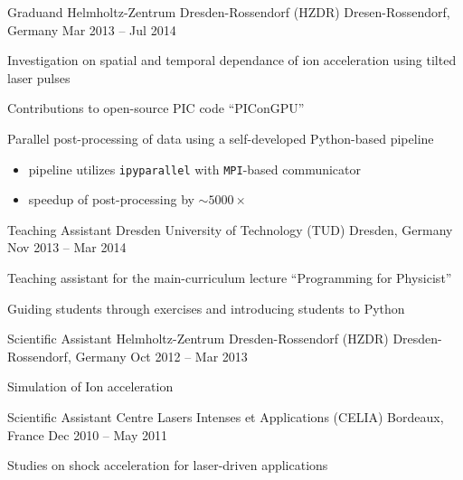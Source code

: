\begin{cventries}
  \cventry
    {Graduand} %
    {Helmholtz-Zentrum Dresden-Rossendorf (HZDR)} %
    {Dresen-Rossendorf, Germany} %
    {Mar 2013 -- Jul 2014} %
    {
      \begin{cvitems} %
        \item Investigation on spatial and temporal dependance of ion acceleration using tilted laser pulses
        \item Contributions to open-source PIC code ``PIConGPU''
        \item Parallel post-processing of data using a self-developed Python-based pipeline
              \begin{itemize}[leftmargin=*, label=$\circ$]
                \item pipeline utilizes \texttt{ipyparallel} with \texttt{MPI}-based communicator
                \item speedup of post-processing by $\sim\!5000\times$
              \end{itemize}
      \end{cvitems}
    }

  \cventry
    {Teaching Assistant} %
    {Dresden University of Technology (TUD)} %
    {Dresden, Germany} %
    {Nov 2013 -- Mar 2014} %
    {
      \begin{cvitems} %
        \item Teaching assistant for the main-curriculum lecture ``Programming for Physicist''
        \item Guiding students through exercises and introducing students to Python
      \end{cvitems}
    }

  \cventry
    {Scientific Assistant} %
    {Helmholtz-Zentrum Dresden-Rossendorf (HZDR)} %
    {Dresden-Rossendorf, Germany} %
    {Oct 2012 -- Mar 2013} %
    {
      \begin{cvitems} %
        \item Simulation of Ion acceleration
      \end{cvitems}
    }

  \cventry
    {Scientific Assistant} %
    {Centre Lasers Intenses et Applications (CELIA)} %
    {Bordeaux, France} %
    {Dec 2010 -- May 2011} %
    {
      \begin{cvitems} %
        \item Studies on shock acceleration for laser-driven applications
      \end{cvitems}
    }


\end{cventries}
